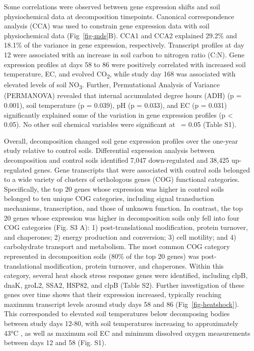 \documentclass[
  sn-nature,
  lineno, referee]{sn-jnl}
\begin{document}
Some correlations were observed between gene expression shifts and soil
physiochemical data at decomposition timepoints. Canonical
correspondence analysis (CCA) was used to constrain gene expression data
with soil physiochemical data (Fig~\ref{fig-mds}B). CCA1 and CCA2
explained 29.2\% and 18.1\% of the variance in gene expression,
respectively. Transcript profiles at day 12 were associated with an
increase in soil carbon to nitrogen ratio (C:N). Gene expression
profiles at days 58 to 86 were positively correlated with increased soil
temperature, EC, and evolved CO\textsubscript{2}, while study day 168
was associated with elevated levels of soil NO\textsubscript{3}.
Further, Permutational Analysis of Variance (PERMANOVA) revealed that
internal accumulated degree hours (ADH) (p = 0.001), soil temperature (p
= 0.039), pH (p = 0.033), and EC (p = 0.031) significantly explained
some of the variation in gene expression profiles (p \textless{} 0.05).
No other soil chemical variables were significant at \textalpha~= 0.05
(Table S1).

Overall, decomposition changed soil gene expression profiles over the
one-year study relative to control soils. Differential expression
analysis between decomposition and control soils identified 7,047
down-regulated and 38,425 up-regulated genes. Gene transcripts that were
associated with control soils belonged to a wide variety of clusters of
orthologous genes (COG) functional categories. Specifically, the top 20
genes whose expression was higher in control soils belonged to ten
unique COG categories, including signal transduction mechanisms,
transcription, and those of unknown function. In contrast, the top 20
genes whose expression was higher in decomposition soils only fell into
four COG categories (Fig. S3 A): 1) post-translational modification,
protein turnover, and chaperones; 2) energy production and conversion;
3) cell motility; and 4) carbohydrate transport and metabolism. The most
common COG category represented in decomposition soils (80\% of the top
20 genes) was post-translational modification, protein turnover, and
chaperones. Within this category, several heat shock stress response
genes were identified, including clpB, dnaK, groL2, SSA2, HSP82, and
clpB (Table S2). Further investigation of these genes over time shows
that their expression increased, typically reaching maximum transcript
levels around study days 58 and 86 (Fig~\ref{fig-heatshock}). This
corresponded to elevated soil temperatures below decomposing bodies
between study days 12-80, with soil temperatures increasing to
approximately 43°C \citep{taylor_transient_2024}, as well as maximum
soil EC and minimum dissolved oxygen measurements between days 12 and 58
(Fig. S1).
\end{document}
